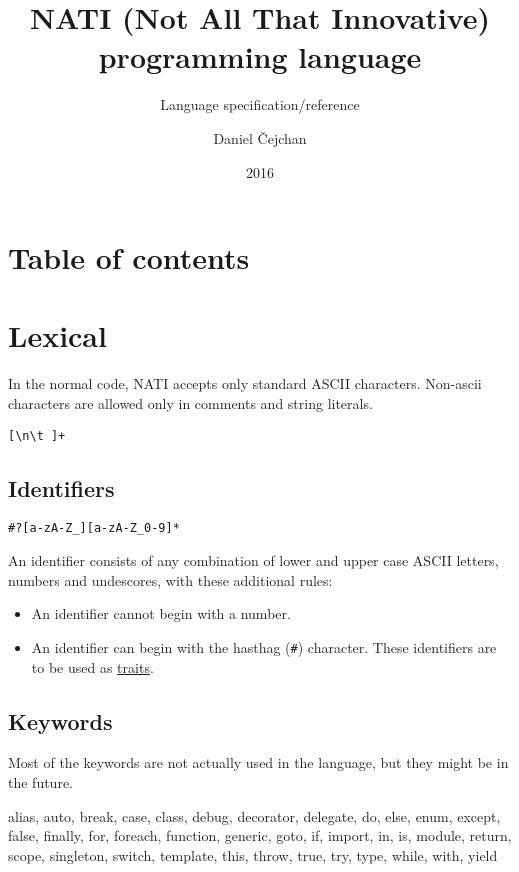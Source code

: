 




\setlength\extrarowheight{2pt}

\title{NATI (Not All That Innovative) programming language}
\subtitle{Language specification/reference}
\author{Daniel Čejchan}
\date{2016}



\mainpage

\chapter{Table of contents}
\makeatletter
{}
\makeatother

\chapter{Lexical}
In the normal code, NATI accepts only standard ASCII characters. Non-ascii characters are allowed only in comments and string literals.

\begin{grammar}
	 \verb|[\n\t ]+|
\end{grammar}

\section{Identifiers}
\begin{grammar}
	 \verb|#?[a-zA-Z_][a-zA-Z_0-9]*|
\end{grammar}
An identifier consists of any combination of lower and upper case ASCII letters, numbers and undescores, with these additional rules:
\begin{itemize}
	\item An identifier cannot begin with a number.
	\item An identifier can begin with the hasthag (\verb|#|) character. These identifiers are to be used as \hyperref[traits]{traits}.
\end{itemize}

\section{Keywords} \label{keywords}
Most of the keywords are not actually used in the language, but they might be in the future.
\begin{code}
alias, auto, break, case, class, debug, decorator, delegate, do, else, enum, except, false, finally, for, foreach, function, generic, goto, if, import, in, is, module, return, scope, singleton, switch, template, this, throw, true, try, type, while, with, yield
\end{code}

